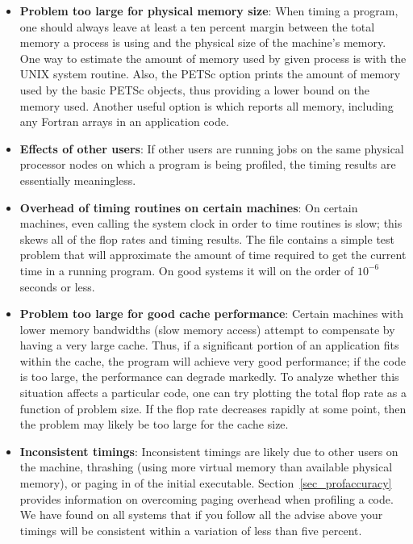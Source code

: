 {{{\begin{itemize}
\item {\bf Problem too large for physical memory size}: When timing a program, one
      should always leave at least a ten percent margin between the total
      memory a process is using and the physical size of
      the machine's memory. One way to estimate the amount of
      memory used by given process is with the UNIX  system routine.
      Also, the PETSc option  prints the amount of
      memory used by the basic PETSc objects, thus providing a lower
      bound on the memory used.  Another useful option is 
      which reports all memory, including any Fortran arrays in an
      application code.
\item {\bf Effects of other users}:  If other users are running
      jobs on the same physical processor nodes on which a program is being profiled,
      the timing results are essentially meaningless.
\item {\bf Overhead of timing routines on certain machines}: On certain machines,
      even calling the system clock in order to time routines is
      slow; this skews all of the flop rates and timing results. The file
      \href{https://www.mcs.anl.gov/petsc/petsc-current/src/benchmarks/PetscTime.c.html}{} contains a
      simple test problem that will approximate the amount of time
      required to get the current time in a running program. On good
      systems it will on the order of $10^{-6}$ seconds or less.
\item {\bf Problem too large for good cache performance}: Certain machines
      with lower memory bandwidths (slow memory access) attempt to
      compensate by having a very large cache.  Thus, if a significant
      portion of an application fits within the cache, the program will achieve very
      good performance; if the code is too large, the performance can degrade markedly.
      To analyze whether this situation affects a particular code, one can
      try plotting the total flop rate as a function of problem
      size.  If the flop rate decreases rapidly at some point, then the
      problem may likely be too large for the cache size.
\item {\bf Inconsistent timings}:  Inconsistent timings are likely due to other
      users on the machine, thrashing (using more virtual memory than available
      physical memory), or paging in of the initial executable.
      Section~\ref{sec_profaccuracy} provides information on overcoming paging
      overhead when profiling a code. We have found on all systems that if you
      follow all the advise above your timings will be consistent within a variation
      of less than five percent.
\end{itemize}

}}}

